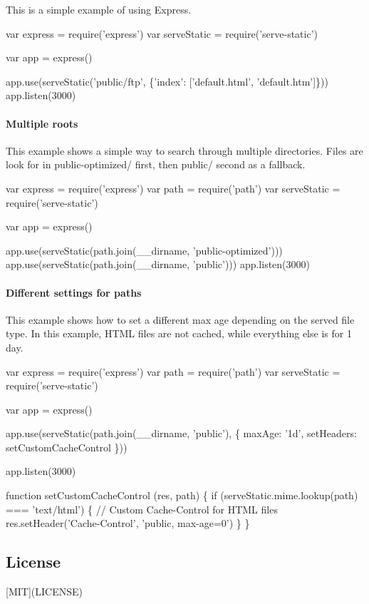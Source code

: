 This is a simple example of using Express.


\begin{DoxyCode}
var express = require('express')
var serveStatic = require('serve-static')

var app = express()

app.use(serveStatic('public/ftp', \{'index': ['default.html', 'default.htm']\}))
app.listen(3000)
\end{DoxyCode}


\paragraph*{Multiple roots}

This example shows a simple way to search through multiple directories. Files are look for in {\ttfamily public-\/optimized/} first, then {\ttfamily public/} second as a fallback.


\begin{DoxyCode}
var express = require('express')
var path = require('path')
var serveStatic = require('serve-static')

var app = express()

app.use(serveStatic(path.join(\_\_dirname, 'public-optimized')))
app.use(serveStatic(path.join(\_\_dirname, 'public')))
app.listen(3000)
\end{DoxyCode}


\paragraph*{Different settings for paths}

This example shows how to set a different max age depending on the served file type. In this example, H\+T\+ML files are not cached, while everything else is for 1 day.


\begin{DoxyCode}
var express = require('express')
var path = require('path')
var serveStatic = require('serve-static')

var app = express()

app.use(serveStatic(path.join(\_\_dirname, 'public'), \{
  maxAge: '1d',
  setHeaders: setCustomCacheControl
\}))

app.listen(3000)

function setCustomCacheControl (res, path) \{
  if (serveStatic.mime.lookup(path) === 'text/html') \{
    // Custom Cache-Control for HTML files
    res.setHeader('Cache-Control', 'public, max-age=0')
  \}
\}
\end{DoxyCode}


\subsection*{License}

\mbox{[}M\+IT\mbox{]}(L\+I\+C\+E\+N\+SE) 